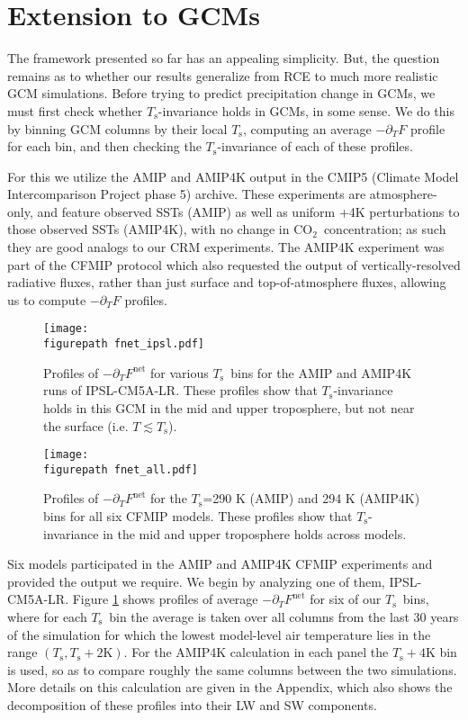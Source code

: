 \documentclass[10pt]{article}
\newcommand{\ppt}{\ensuremath{\partial_T}}
\newcommand{\cotwo}{\ensuremath{\mathrm{CO_2}}}
\newcommand{\Fnet}{\ensuremath{F^\mathrm{net}}}
\newcommand{\Ts}{\ensuremath{T_\mathrm{s}}}
\newcommand{\Kelvin}{\ensuremath{\mathrm{K}}}
\newcommand{\figurepath}{../figures/}
\begin{document}
\section{Extension to GCMs} \label{sec_GCMs}
The framework presented so far has an appealing simplicity. But, the question remains as to whether our results generalize from RCE to much more realistic GCM simulations. Before trying to predict precipitation change in GCMs,  we must first check  whether \Ts-invariance holds in GCMs, in some sense. We do this by binning  GCM columns by their local \Ts, computing an average $-\ppt F$ profile for each bin, and then checking the \Ts-invariance of each of these profiles. 


For this we utilize the AMIP and AMIP4K  output in the CMIP5 (Climate Model Intercomparison Project phase 5) archive. These experiments are atmosphere-only, and feature observed SSTs (AMIP) as well as uniform +4K perturbations to those observed SSTs (AMIP4K), with no change in \cotwo\ concentration; as such they are good analogs to our CRM experiments. The AMIP4K experiment was part of the CFMIP protocol \citep[Cloud Feedback Model Intercomparison Project,][]{bony2011} which also requested the output of vertically-resolved radiative fluxes, rather than just surface and top-of-atmosphere fluxes, allowing us to compute $-\ppt F$ profiles.

\begin{figure}[t]
	\begin{center}
			\texttt{[image: \\figurepath fnet\_ipsl.pdf]}
		\caption{ Profiles of $-\ppt \Fnet$ for various \Ts\ bins for the AMIP and AMIP4K runs of IPSL-CM5A-LR.  These profiles show that \Ts-invariance holds in this GCM in the mid and upper troposphere, but not near the surface (i.e. $T \lesssim \Ts$).
		\label{fnet_ipsl}
		}
	\end{center}
\end{figure}


\begin{figure}[t]
	\begin{center}
			\texttt{[image: \\figurepath fnet\_all.pdf]}
		\caption{ Profiles of $-\ppt \Fnet$ for the \Ts=290 K (AMIP) and 294 K (AMIP4K) bins for all six CFMIP models. These profiles show that \Ts-invariance in the mid and upper troposphere holds across models.
		\label{fnet_all}
		}
	\end{center}
\end{figure}

Six models participated in the AMIP and AMIP4K CFMIP experiments and provided the output we require. We begin by analyzing one of them, IPSL-CM5A-LR. Figure \ref{fnet_ipsl} shows  profiles of average $-\ppt \Fnet$ for six of our \Ts\ bins, where for each \Ts\ bin the average is taken over  all columns from the last 30 years of the simulation for which the lowest model-level air temperature lies in the range $(\Ts,\Ts +2\Kelvin)$. For the AMIP4K calculation in each panel the $\Ts +4\Kelvin$ bin is used, so as to compare roughly the same columns between the two simulations. More details on this calculation are given in the Appendix, which also shows the decomposition of these profiles into their LW and SW components. 
\end{document}
